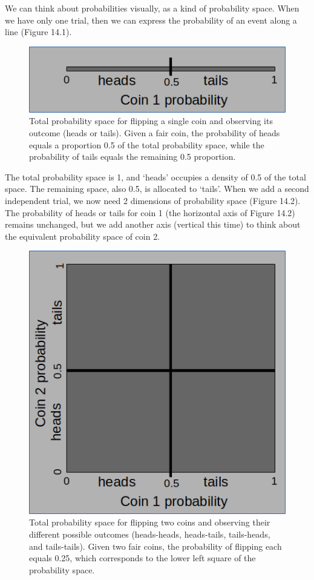 \documentclass[
]{scrbook}
\begin{document}
We can think about probabilities visually, as a kind of probability space.
When we have only one trial, then we can express the probability of an event along a line (Figure 14.1).

\begin{figure}
\includegraphics[width=1\linewidth]{img/coin1_probability} \caption{Total probability space for flipping a single coin and observing its outcome (heads or tails). Given a fair coin, the probability of heads equals a proportion 0.5 of the total probability space, while the probability of tails equals the remaining 0.5 proportion.}\label{fig:unnamed-chunk-50}
\end{figure}

The total probability space is 1, and `heads' occupies a density of 0.5 of the total space.
The remaining space, also 0.5, is allocated to `tails'.
When we add a second independent trial, we now need 2 dimensions of probability space (Figure 14.2).
The probability of heads or tails for coin 1 (the horizontal axis of Figure 14.2) remains unchanged, but we add another axis (vertical this time) to think about the equivalent probability space of coin 2.

\begin{figure}
\includegraphics[width=1\linewidth]{img/coin2_probability} \caption{Total probability space for flipping two coins and observing their different possible outcomes (heads-heads, heads-tails, tails-heads, and tails-tails). Given two fair coins, the probability of flipping each equals 0.25, which corresponds to the lower left square of the probability space.}\label{fig:unnamed-chunk-51}
\end{figure}
\end{document}
